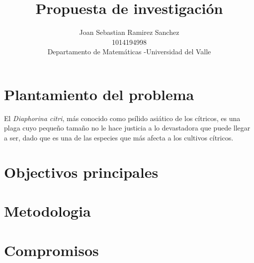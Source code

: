 \documentclass{article}
\title{
    Propuesta de investigación
}
\author{Joan Sebastian Ramirez Sanchez \\ 1014194998 \\ Departamento de Matemáticas
-Universidad del Valle}
\begin{document}
\maketitle


\section*{Plantamiento del problema}
El \textit{Diaphorina citri}, más conocido como psílido asiático de los cítricos, es una plaga cuyo pequeño tamaño no le hace justicia a lo devastadora que puede llegar a ser, dado que es una de las especies que más afecta a los cultivos cítricos.
\section*{Objectivos principales}
\section*{Metodologia}
\section*{Compromisos}
\end{document}

